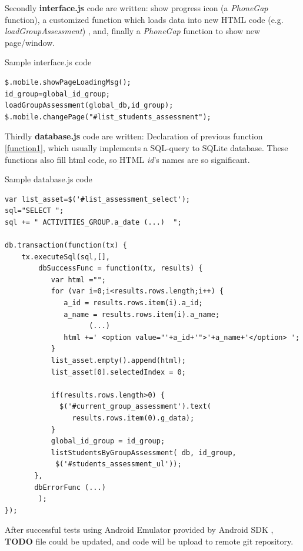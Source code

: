 	   
    Secondly { \bf interface.js} code are written: show progress icon (a \emph{PhoneGap} function), a customized function which loads data into new HTML code (e.g. \emph{loadGroupAssessment}) , 
    and, finally a \emph{PhoneGap} function to  show new page/window.
\begin{bclogo}[couleur=blue!30,arrondi=0.1,ombre=true ] 
{Sample interface.js code}        
        \begin{verbatim}
$.mobile.showPageLoadingMsg();
id_group=global_id_group; 
loadGroupAssessment(global_db,id_group);
$.mobile.changePage("#list_students_assessment");
    \end{verbatim}  
\end{bclogo}

    Thirdly {\bf database.js} code are written: Declaration of previous function \ref{function1}, which  usually implements a SQL-query to SQLite database. These functions also fill html code, so HTML \emph{id}'s names are so significant.
    
\begin{bclogo}[couleur=blue!30,arrondi=0.1,ombre=true ] 
{Sample database.js code}    
\begin{verbatim}
var list_asset=$('#list_assessment_select'); 
sql="SELECT ";
sql += " ACTIVITIES_GROUP.a_date (...)  ";

db.transaction(function(tx) {
    tx.executeSql(sql,[],
        dbSuccessFunc = function(tx, results) {
           var html ="";
           for (var i=0;i<results.rows.length;i++) {
              a_id = results.rows.item(i).a_id;
              a_name = results.rows.item(i).a_name;
                    (...)
              html +=' <option value="'+a_id+'">'+a_name+'</option> ';
           }
           list_asset.empty().append(html);
           list_asset[0].selectedIndex = 0; 

           if(results.rows.length>0) {
             $('#current_group_assessment').text(
                results.rows.item(0).g_data); 
           }
           global_id_group = id_group;
           listStudentsByGroupAssessment( db, id_group, 
            $('#students_assessment_ul'));
       },
       dbErrorFunc (...)
        ); 
});
\end{verbatim}    
\end{bclogo}    
    
    After successful tests using Android Emulator provided by Android SDK \cite{AndroidDevelopmentKit}, {\bf TODO} file could be updated, and code will be upload to remote git \cite{EduXes} repository.
  
